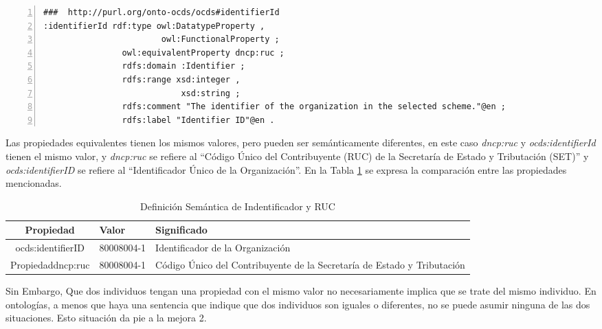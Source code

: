 \noindent\begin{minipage}{\textwidth}
 \begin{lstlisting}[captionpos=b, caption={Declaración de equivalencia semántica entre dncp:ruc y ocds:identifierID}, label=lst:caso2-2,  numbers=left,  numberstyle=\tiny\color{mygray},frame=single]
###  http://purl.org/onto-ocds/ocds#identifierId
:identifierId rdf:type owl:DatatypeProperty ,
                        owl:FunctionalProperty ;
                owl:equivalentProperty dncp:ruc ;
                rdfs:domain :Identifier ;
                rdfs:range xsd:integer ,
                            xsd:string ;
                rdfs:comment "The identifier of the organization in the selected scheme."@en ;
                rdfs:label "Identifier ID"@en .
 \end{lstlisting}
\end{minipage}

 Las propiedades equivalentes tienen los mismos valores, pero pueden ser semánticamente diferentes, en este caso \textit{dncp:ruc} y \textit{ocds:identifierId} tienen el mismo valor, y \textit{dncp:ruc} se refiere al “Código Único del Contribuyente (RUC) de la Secretaría de Estado y Tributación (SET)” y \textit{ocds:identifierID} se refiere al “Identificador Único de la Organización”. En la Tabla \ref{table:semanticaID} se expresa la comparación entre las propiedades mencionadas.

 \begin{table}[!htb]
    \centering
    \caption{Definición Semántica de Indentificador y RUC}
    \label{table:semanticaID}
    \resizebox{15cm}{!} {
    \begin{tabular}{|c|l|l|}
    \hline
    
Propiedad & Valor &  Significado \\ \hline

ocds:identifierID  & 80008004-1 &  Identificador de la Organización \\ \hline
Propiedaddncp:ruc & 80008004-1 &  Código Único del Contribuyente de la Secretaría de Estado y Tributación \\ \hline

    \end{tabular}
    }
    \end{table}
    
 Sin Embargo, Que dos individuos tengan una propiedad con el mismo valor no necesariamente implica que se trate del mismo individuo. En ontologías, a menos que haya una sentencia que indique que dos individuos son iguales o diferentes, no se puede asumir ninguna de las dos situaciones. Esto situación da pie a la mejora 2.

